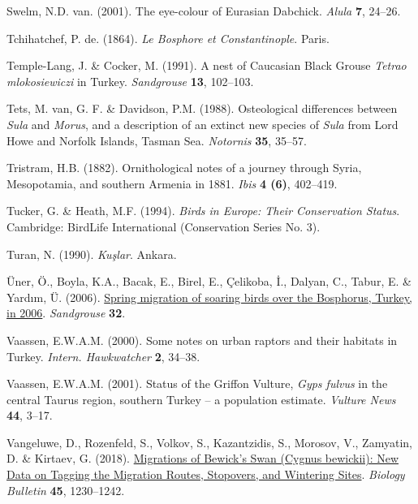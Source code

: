 \documentclass[
  a4paper,
  DIV=11,
  numbers=noendperiod]{scrreprt}
\newlength{\cslhangindent}
\newenvironment{CSLReferences}[2] %
 {\begin{list}{}{%
  \setlength{\itemindent}{0pt}
  \setlength{\leftmargin}{0pt}
  \setlength{\parsep}{0pt}
  \ifodd #1
   \setlength{\leftmargin}{\cslhangindent}
   \setlength{\itemindent}{-1\cslhangindent}
  \fi
  \setlength{\itemsep}{#2\baselineskip}}}
 {\end{list}}
\begin{document}
\begin{CSLReferences}{1}{1}
Swelm, N.D. van. (2001). {The eye-colour of Eurasian Dabchick}.
\emph{Alula} \textbf{7}, 24--26.

Tchihatchef, P. de. (1864). \emph{{Le Bosphore et Constantinople}}.
Paris.

Temple-Lang, J. \& Cocker, M. (1991). {A nest of Caucasian Black Grouse
\emph{Tetrao mlokosiewiczi} in Turkey}. \emph{Sandgrouse} \textbf{13},
102--103.

Tets, M. van, G. F. \& Davidson, P.M. (1988). {Osteological differences
between \emph{Sula} and \emph{Morus}, and a description of an extinct
new species of \emph{Sula} from Lord Howe and Norfolk Islands, Tasman
Sea}. \emph{Notornis} \textbf{35}, 35--57.

Tristram, H.B. (1882). {Ornithological notes of a journey through Syria,
Mesopotamia, and southern Armenia in 1881}. \emph{Ibis} \textbf{4 (6)},
402--419.

Tucker, G. \& Heath, M.F. (1994). \emph{{Birds in Europe: Their
Conservation Status}}. Cambridge: BirdLife International (Conservation
Series No. 3).

Turan, N. (1990). \emph{{Kuşlar}}. Ankara.

Üner, Ö., Boyla, K.A., Bacak, E., Birel, E., Çelikoba, İ., Dalyan, C.,
Tabur, E. \& Yardım, Ü. (2006).
\href{https://osme.org/sandgrouse/}{{Spring migration of soaring birds
over the Bosphorus, Turkey, in 2006}}. \emph{Sandgrouse} \textbf{32}.

Vaassen, E.W.A.M. (2000). {Some notes on urban raptors and their
habitats in Turkey}. \emph{Intern. Hawkwatcher} \textbf{2}, 34--38.

Vaassen, E.W.A.M. (2001). {Status of the Griffon Vulture, \emph{Gyps
fulvus} in the central Taurus region, southern Turkey -- a population
estimate}. \emph{Vulture News} \textbf{44}, 3--17.

Vangeluwe, D., Rozenfeld, S., Volkov, S., Kazantzidis, S., Morosov, V.,
Zamyatin, D. \& Kirtaev, G. (2018).
\href{https://doi.org/10.1134/S1062359018070178}{{Migrations of Bewick's
Swan (Cygnus bewickii): New Data on Tagging the Migration Routes,
Stopovers, and Wintering Sites}}. \emph{Biology Bulletin} \textbf{45},
1230--1242.


\end{CSLReferences}
\end{document}
